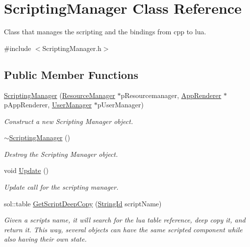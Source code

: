 \hypertarget{classScriptingManager}{}\section{Scripting\+Manager Class Reference}
\label{classScriptingManager}


Class that manages the scripting and the bindings from cpp to lua.  




{\ttfamily \#include $<$Scripting\+Manager.\+h$>$}

\subsection*{Public Member Functions}
\begin{DoxyCompactItemize}
\item 
\hyperlink{classScriptingManager_afc9f4dc0241ba5a7aec3258757b18bff}{Scripting\+Manager} (\hyperlink{classResourceManager}{Resource\+Manager} $\ast$p\+Resourcemanager, \hyperlink{classAppRenderer}{App\+Renderer} $\ast$p\+App\+Renderer, \hyperlink{classUserManager}{User\+Manager} $\ast$p\+User\+Manager)
\begin{DoxyCompactList}\small\item\em Construct a new Scripting Manager object. \end{DoxyCompactList}\item 
\mbox{\label{classScriptingManager_a2266b308e615f0d19b823c3c38f76ad6}} 
\hyperlink{classScriptingManager_a2266b308e615f0d19b823c3c38f76ad6}{$\sim$\+Scripting\+Manager} ()
\begin{DoxyCompactList}\small\item\em Destroy the Scripting Manager object. \end{DoxyCompactList}\item 
\mbox{\label{classScriptingManager_a992e8bd3e6d21e793abceb684d4717ae}} 
void \hyperlink{classScriptingManager_a992e8bd3e6d21e793abceb684d4717ae}{Update} ()
\begin{DoxyCompactList}\small\item\em Update call for the scripting manager. \end{DoxyCompactList}\item 
sol\+::table \hyperlink{classScriptingManager_a11b9b6914dd4f5c2daa8ece918e0131c}{Get\+Script\+Deep\+Copy} (\hyperlink{classStringId}{String\+Id} script\+Name)
\begin{DoxyCompactList}\small\item\em Given a script\textquotesingle{}s name, it will search for the lua table reference, deep copy it, and return it. This way, several objects can have the same scripted component while also having their own state. \end{DoxyCompactList}\end{DoxyCompactItemize}

